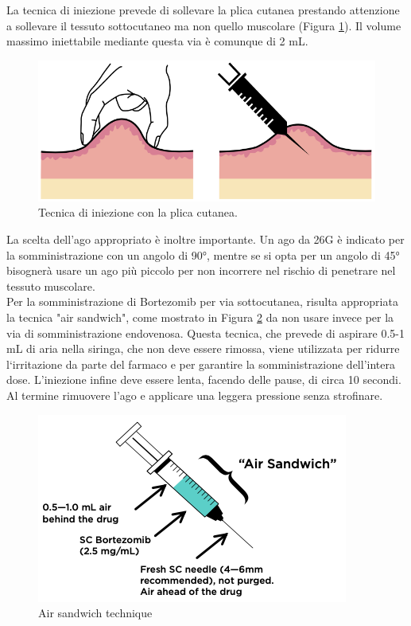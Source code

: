 La tecnica di iniezione prevede di sollevare la plica cutanea prestando attenzione a sollevare il tessuto 
sottocutaneo ma non quello muscolare (Figura \ref{fig:FIGURE_3.6}). Il volume massimo iniettabile mediante questa via è comunque di 2 mL.\\

\begin{figure}[H]
    \begin{center}
    \includegraphics[width=0.5\columnwidth]{img/PLICA.png}
    \end{center}
    \caption{ Tecnica di iniezione con la plica cutanea.
    \cite{BORTEZOMIB}}
    \label{fig:FIGURE_3.6}
\end{figure}

La scelta dell’ago appropriato è inoltre importante. Un ago da 26G è indicato per la somministrazione con un angolo di
90°, mentre se si opta per un angolo di 45° bisognerà usare un ago più piccolo per non incorrere nel rischio di 
penetrare nel tessuto muscolare\cite{BORTNURSES}.\\
Per la somministrazione di Bortezomib per via sottocutanea, risulta appropriata la tecnica "air sandwich", 
come mostrato in Figura \ref{fig:FIGURE_3.7}
da non usare invece per la via di somministrazione endovenosa. Questa tecnica, che prevede di aspirare 0.5-1 mL 
di aria nella siringa, che non deve essere rimossa, viene utilizzata per ridurre l‘irritazione da parte del farmaco e 
per garantire la somministrazione dell’intera dose. L’iniezione infine deve essere lenta, facendo delle pause, 
di circa 10 secondi. Al termine rimuovere l’ago e applicare una leggera pressione senza strofinare\cite{BORTNURSES}.\\

\begin{figure}[H]
    \begin{center}
    \includegraphics[width=0.5\columnwidth]{img/SIRINGA.png}
    \end{center}
    \caption{ Air sandwich technique
    \cite{BORTEZOMIB}}
    \label{fig:FIGURE_3.7}
\end{figure}

